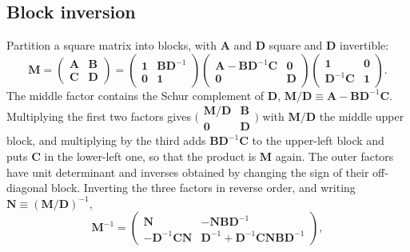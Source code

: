\subsection{Block inversion}

Partition a square matrix into blocks, with $\mathbf{A}$ and $\mathbf{D}$ square and $\mathbf{D}$ invertible:
\begin{equation*}
  \mathbf{M} = \begin{pmatrix}\mathbf{A} & \mathbf{B}\\ \mathbf{C} & \mathbf{D}\end{pmatrix}
  = \begin{pmatrix}\mathbf{1} & \mathbf{B}\mathbf{D}^{-1}\\ \mathbf{0} & \mathbf{1}\end{pmatrix}
    \begin{pmatrix}\mathbf{A} - \mathbf{B}\mathbf{D}^{-1}\mathbf{C} & \mathbf{0}\\ \mathbf{0} & \mathbf{D}\end{pmatrix}
    \begin{pmatrix}\mathbf{1} & \mathbf{0}\\ \mathbf{D}^{-1}\mathbf{C} & \mathbf{1}\end{pmatrix} .
\end{equation*}
The middle factor contains the Schur complement of $\mathbf{D}$, $\mathbf{M}/\mathbf{D} \equiv \mathbf{A} - \mathbf{B}\mathbf{D}^{-1}\mathbf{C}$. Multiplying the first two factors gives $\bigl(\begin{smallmatrix}\mathbf{M}/\mathbf{D} & \mathbf{B}\\ \mathbf{0} & \mathbf{D}\end{smallmatrix}\bigr)$ with $\mathbf{M}/\mathbf{D}$ the middle upper block, and multiplying by the third adds $\mathbf{B}\mathbf{D}^{-1}\mathbf{C}$ to the upper-left block and puts $\mathbf{C}$ in the lower-left one, so that the product is $\mathbf{M}$ again. The outer factors have unit determinant and inverses obtained by changing the sign of their off-diagonal block. Inverting the three factors in reverse order, and writing $\mathbf{N} \equiv (\mathbf{M}/\mathbf{D})^{-1}$,
\begin{equation}
  \mathbf{M}^{-1} = \begin{pmatrix}\mathbf{N} & -\mathbf{N}\mathbf{B}\mathbf{D}^{-1}\\ -\mathbf{D}^{-1}\mathbf{C}\mathbf{N} & \mathbf{D}^{-1} + \mathbf{D}^{-1}\mathbf{C}\mathbf{N}\mathbf{B}\mathbf{D}^{-1}\end{pmatrix} ,
  \label{eq:C.7-block}
\end{equation}
